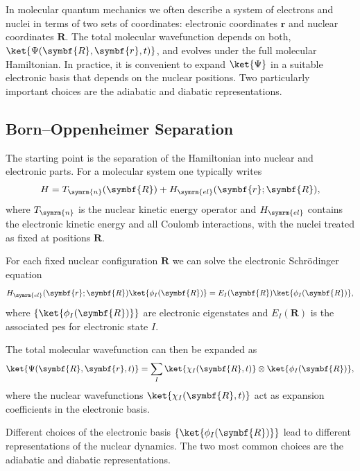 \section{\filetotitle}\label{sec:adiabatic_vs_diabatic_representation}
In molecular quantum mechanics we often describe a system of electrons and nuclei in terms of two sets of coordinates: electronic coordinates $\symbf{r}$ and nuclear coordinates $\symbf{R}$. The total molecular wavefunction depends on both, $\ket{\Psi(\symbf{R},\symbf{r},t)}$, and evolves under the full molecular Hamiltonian. In practice, it is convenient to expand $\ket{\Psi}$ in a suitable electronic basis that depends on the nuclear positions. Two particularly important choices are the adiabatic and diabatic representations.
\subsection{Born--Oppenheimer Separation}\label{sec:born_oppenheimer_separation}
The starting point is the separation of the Hamiltonian into nuclear and electronic parts. For a molecular system one typically writes
\begin{equation}\label{eq:boa_hamiltonian}
H=T_{\symrm{n}}(\symbf{R})+H_{\symrm{el}}(\symbf{r};\symbf{R}),
\end{equation}
where $T_{\symrm{n}}$ is the nuclear kinetic energy operator and $H_{\symrm{el}}$ contains the electronic kinetic energy and all Coulomb interactions, with the nuclei treated as fixed at positions $\symbf{R}$.

For each fixed nuclear configuration $\symbf{R}$ we can solve the electronic Schr\"odinger equation
\begin{equation}
H_{\symrm{el}}(\symbf{r};\symbf{R})\ket{\phi_I(\symbf{R})}=E_I(\symbf{R})\ket{\phi_I(\symbf{R})},
\end{equation}
where $\{\ket{\phi_I(\symbf{R})}\}$ are electronic eigenstates and $E_I(\symbf{R})$ is the associated \acrfull{pes} for electronic state $I$.

The total molecular wavefunction can then be expanded as
\begin{equation}\label{eq:boa_expansion}
\ket{\Psi(\symbf{R},\symbf{r},t)}=\sum_I\ket{\chi_I(\symbf{R},t)}\otimes\ket{\phi_I(\symbf{R})},
\end{equation}
where the nuclear wavefunctions $\ket{\chi_I(\symbf{R},t)}$ act as expansion coefficients in the electronic basis.

Different choices of the electronic basis $\{\ket{\phi_I(\symbf{R})}\}$ lead to different representations of the nuclear dynamics. The two most common choices are the adiabatic and diabatic representations.
